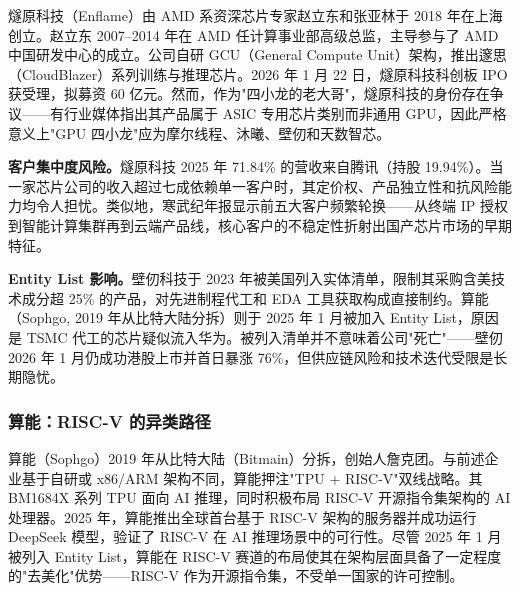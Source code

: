 燧原科技（Enflame）由 AMD 系资深芯片专家赵立东和张亚林于 2018 年在上海创立。赵立东 2007--2014 年在 AMD 任计算事业部高级总监，主导参与了 AMD 中国研发中心的成立。公司自研 GCU（General Compute Unit）架构，推出邃思（CloudBlazer）系列训练与推理芯片。2026 年 1 月 22 日，燧原科技科创板 IPO 获受理，拟募资 60 亿元。然而，作为"四小龙的老大哥"，燧原科技的身份存在争议——有行业媒体指出其产品属于 ASIC 专用芯片类别而非通用 GPU，因此严格意义上"GPU 四小龙"应为摩尔线程、沐曦、壁仞和天数智芯。

\begin{warnbox}
\textbf{客户集中度风险。}燧原科技 2025 年 71.84\% 的营收来自腾讯（持股 19.94\%）。当一家芯片公司的收入超过七成依赖单一客户时，其定价权、产品独立性和抗风险能力均令人担忧。类似地，寒武纪年报显示前五大客户频繁轮换——从终端 IP 授权到智能计算集群再到云端产品线，核心客户的不稳定性折射出国产芯片市场的早期特征。

\textbf{Entity List 影响。}壁仞科技于 2023 年被美国列入实体清单，限制其采购含美技术成分超 25\% 的产品，对先进制程代工和 EDA 工具获取构成直接制约。算能（Sophgo, 2019 年从比特大陆分拆）则于 2025 年 1 月被加入 Entity List，原因是 TSMC 代工的芯片疑似流入华为。被列入清单并不意味着公司"死亡"——壁仞 2026 年 1 月仍成功港股上市并首日暴涨 76\%，但供应链风险和技术迭代受限是长期隐忧。
\end{warnbox}

\subsubsection{算能：RISC-V 的异类路径}

算能（Sophgo）2019 年从比特大陆（Bitmain）分拆，创始人詹克团。与前述企业基于自研或 x86/ARM 架构不同，算能押注"TPU + RISC-V"双线战略。其 BM1684X 系列 TPU 面向 AI 推理，同时积极布局 RISC-V 开源指令集架构的 AI 处理器。2025 年，算能推出全球首台基于 RISC-V 架构的服务器并成功运行 DeepSeek 模型，验证了 RISC-V 在 AI 推理场景中的可行性。尽管 2025 年 1 月被列入 Entity List，算能在 RISC-V 赛道的布局使其在架构层面具备了一定程度的"去美化"优势——RISC-V 作为开源指令集，不受单一国家的许可控制。


